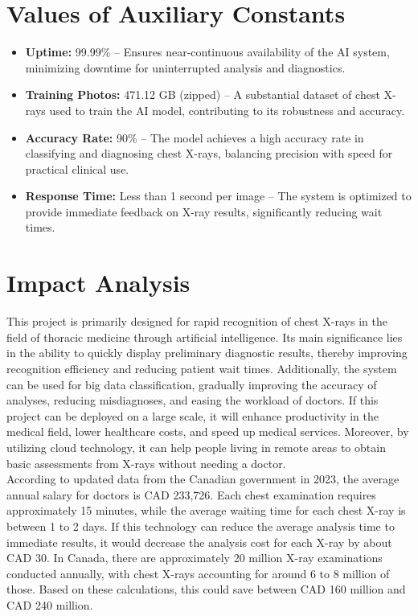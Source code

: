 \documentclass[12pt]{article}
\begin{document}
\section{Values of Auxiliary Constants}

\begin{itemize}
    \item \textbf{Uptime:} 99.99\% – Ensures near-continuous availability of the AI system, minimizing downtime for uninterrupted analysis and diagnostics.
    \item \textbf{Training Photos:} 471.12 GB (zipped) – A substantial dataset of chest X-rays used to train the AI model, contributing to its robustness and accuracy.
    \item \textbf{Accuracy Rate:} 90\% – The model achieves a high accuracy rate in classifying and diagnosing chest X-rays, balancing precision with speed for practical clinical use.
    \item \textbf{Response Time:} Less than 1 second per image – The system is optimized to provide immediate feedback on X-ray results, significantly reducing wait times.
\end{itemize}

\section{Impact Analysis}
This project is primarily designed for rapid recognition of chest X-rays in the field of thoracic medicine through artificial intelligence. Its main significance lies in the ability to quickly display preliminary diagnostic results, thereby improving recognition efficiency and reducing patient wait times. Additionally, the system can be used for big data classification, gradually improving the accuracy of analyses, reducing misdiagnoses, and easing the workload of doctors. If this project can be deployed on a large scale, it will enhance productivity in the medical field, lower healthcare costs, and speed up medical services. Moreover, by utilizing cloud technology, it can help people living in remote areas to obtain basic assessments from X-rays without needing a doctor. \\

According to updated data from the Canadian government in 2023, the average annual salary for doctors is CAD 233,726. Each chest examination requires approximately 15 minutes, while the average waiting time for each chest X-ray is between 1 to 2 days. If this technology can reduce the average analysis time to immediate results, it would decrease the analysis cost for each X-ray by about CAD 30. In Canada, there are approximately 20 million X-ray examinations conducted annually, with chest X-rays accounting for around 6 to 8 million of those. Based on these calculations, this could save between CAD 160 million and CAD 240 million. \\
\end{document}

